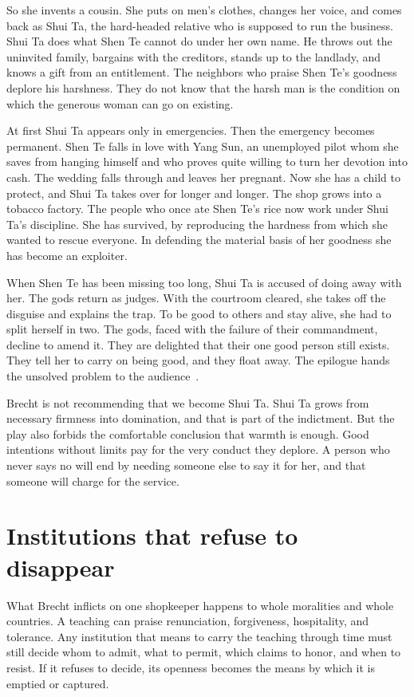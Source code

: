\documentclass[12pt,a4paper]{book}
\begin{document}
So she invents a cousin. She puts on men's clothes, changes her voice, and comes back as Shui Ta, the hard-headed relative who is supposed to run the business. Shui Ta does what Shen Te cannot do under her own name. He throws out the uninvited family, bargains with the creditors, stands up to the landlady, and knows a gift from an entitlement. The neighbors who praise Shen Te's goodness deplore his harshness. They do not know that the harsh man is the condition on which the generous woman can go on existing.

At first Shui Ta appears only in emergencies. Then the emergency becomes permanent. Shen Te falls in love with Yang Sun, an unemployed pilot whom she saves from hanging himself and who proves quite willing to turn her devotion into cash. The wedding falls through and leaves her pregnant. Now she has a child to protect, and Shui Ta takes over for longer and longer. The shop grows into a tobacco factory. The people who once ate Shen Te's rice now work under Shui Ta's discipline. She has survived, by reproducing the hardness from which she wanted to rescue everyone. In defending the material basis of her goodness she has become an exploiter.

When Shen Te has been missing too long, Shui Ta is accused of doing away with her. The gods return as judges. With the courtroom cleared, she takes off the disguise and explains the trap. To be good to others and stay alive, she had to split herself in two. The gods, faced with the failure of their commandment, decline to amend it. They are delighted that their one good person still exists. They tell her to carry on being good, and they float away. The epilogue hands the unsolved problem to the audience~\cite{Brecht-GMvS}.

Brecht is not recommending that we become Shui Ta. Shui Ta grows from necessary firmness into domination, and that is part of the indictment. But the play also forbids the comfortable conclusion that warmth is enough. Good intentions without limits pay for the very conduct they deplore. A person who never says no will end by needing someone else to say it for her, and that someone will charge for the service.

\section{Institutions that refuse to disappear}

What Brecht inflicts on one shopkeeper happens to whole moralities and whole countries. A teaching can praise renunciation, forgiveness, hospitality, and tolerance. Any institution that means to carry the teaching through time must still decide whom to admit, what to permit, which claims to honor, and when to resist. If it refuses to decide, its openness becomes the means by which it is emptied or captured.
\end{document}
